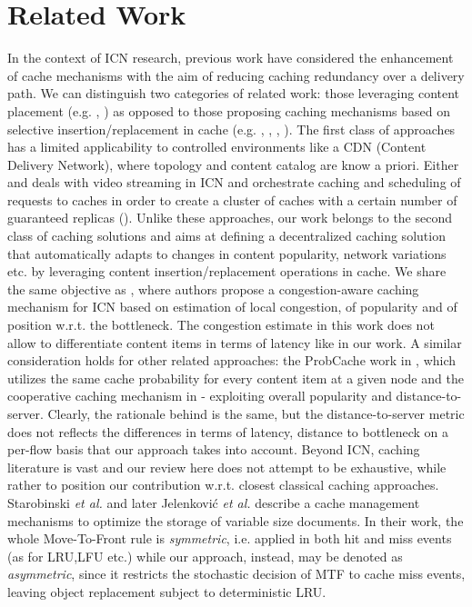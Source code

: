 \documentclass[conference]{IEEEtran}
\begin{document}
\section{Related Work} \label{sec:related_work}
In the context of ICN research, previous work have considered 
the enhancement of cache mechanisms with the aim of reducing 
caching redundancy over a delivery path. We can distinguish 
two categories of related work: those leveraging content 
placement (e.g. \cite{Congestion-Aware-Gerla}, 
\cite{Time-Shifted-Simon}) as opposed to
those proposing caching mechanisms based on selective 
insertion/replacement in cache (e.g. \cite{Prob-Cache}, 
\cite{ICN2014-Kurose}, \cite{LCN2014}, \cite{Age-Based}).
The first class of approaches has a limited applicability to 
controlled environments like a CDN (Content Delivery 
Network), where topology and content catalog are know a 
priori. Either \cite{Congestion-Aware-Gerla} and 
\cite{Time-Shifted-Simon} deals with video streaming 
in ICN and orchestrate caching and scheduling of requests to 
caches in order to create a cluster of caches with a certain 
number of guaranteed replicas (\cite{Time-Shifted-Simon}).
Unlike these approaches, our work belongs to the second class 
of caching solutions and aims at defining a decentralized 
caching solution that automatically adapts to changes in 
content popularity, network variations etc. by leveraging 
content insertion/replacement operations in cache. 
We share the same objective as \cite{ICN2014-Kurose}, where 
authors propose a congestion-aware caching mechanism
for ICN based on estimation of local congestion,  
of popularity and of position w.r.t. the bottleneck. 
The congestion estimate in this work does not allow to 
differentiate content items in terms of latency like in our 
work. A similar consideration holds for other related 
approaches: the ProbCache work in \cite{Prob-Cache}, which 
utilizes the same cache probability for every content item at 
a given node and the cooperative caching mechanism in 
\cite{LCN2014}-\cite{Age-Based} exploiting overall popularity 
and distance-to-server. Clearly, the rationale behind is the 
same, but the distance-to-server metric does not reflects the 
differences in terms of latency, distance to bottleneck on a 
per-flow basis that our approach takes into account. 
Beyond ICN, caching literature is vast 
\cite{Podlipnig:2003:SWC:954339.954341} and our review 
here does not attempt to be exhaustive, while rather to 
position our contribution w.r.t. closest classical caching 
approaches. Starobinski 
\textit{et al.}
\cite{Starobinski:2001:PMW:570289.570293} and later
Jelenkovi\'{c} 
\textit{et al.}\cite{Jelenkovic:2004:OLC:1024662.1024670} 
describe a cache management mechanisms to optimize the 
storage of variable size documents. In their work, the whole 
Move-To-Front rule is \textit{symmetric}, i.e. applied in 
both hit and miss events (as for LRU,LFU etc.)
while our approach, instead, may be denoted as 
\textit{asymmetric}, since it restricts the stochastic 
decision of MTF to cache miss events, leaving object 
replacement subject to deterministic LRU. 
\end{document}
